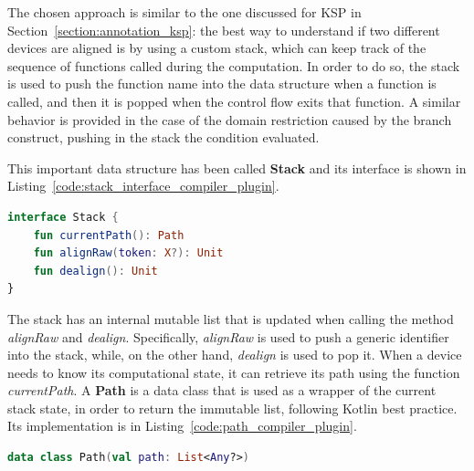 The chosen approach is similar to the one discussed for KSP in Section~\ref{section:annotation_ksp}: the best way to understand if two different devices are aligned is by using a custom stack, which can keep track of the sequence of functions called during the computation. In order to do so, the stack is used to push the function name into the data structure when a function is called, and then it is popped when the control flow exits that function. A similar behavior is provided in the case of the domain restriction caused by the branch construct, pushing in the stack the condition evaluated.

This important data structure has been called \textbf{Stack} and its interface is shown in Listing~\ref{code:stack_interface_compiler_plugin}.
\begin{lstlisting}[caption={Stack interface for Kotlin compiler plugin solution}, captionpos=b, language=Kotlin, label={code:stack_interface_compiler_plugin}]
interface Stack {
    fun currentPath(): Path
    fun alignRaw(token: X?): Unit
    fun dealign(): Unit
}
\end{lstlisting}
The stack has an internal mutable list that is updated when calling the method \textit{alignRaw} and \textit{dealign}. Specifically, \textit{alignRaw} is used to push a generic identifier into the stack, while, on the other hand, \textit{dealign} is used to pop it.\newline
When a device needs to know its computational state, it can retrieve its path using the function \textit{currentPath}. A \textbf{Path} is a data class that is used as a wrapper of the current stack state, in order to return the immutable list, following Kotlin best practice. Its implementation is in Listing~\ref{code:path_compiler_plugin}.
\begin{lstlisting}[caption={Path dataclass for Kotlin compiler plugin solution}, captionpos=b, language=Kotlin, label={code:path_compiler_plugin}]
data class Path(val path: List<Any?>)
\end{lstlisting}

